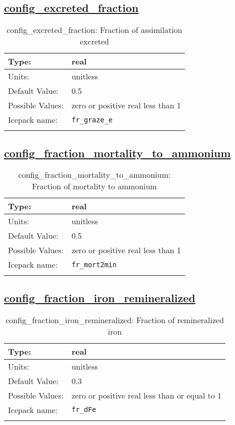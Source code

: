 \subsection[config\_excreted\_fraction]{\hyperref[sec:nm_tab_biogeochemistry]{config\_excreted\_fraction}}
\label{subsec:nm_sec_config_excreted_fraction}
\begin{center}
\begin{longtable}{| p{2.0in} || p{4.0in} |}
    \hline
    Type: & real \\
    \hline
    Units: & \si{unitless} \\
    \hline
    Default Value: & 0.5 \\
    \hline
    Possible Values: & zero or positive real less than 1 \\
    \hline
    Icepack name: & \verb+fr_graze_e+ \\
    \hline
    \caption{config\_excreted\_fraction: Fraction of assimilation excreted}
\end{longtable}
\end{center}
\subsection[config\_fraction\_mortality\_to\_ammonium]{\hyperref[sec:nm_tab_biogeochemistry]{config\_fraction\_mortality\_to\_ammonium}}
\label{subsec:nm_sec_config_fraction_mortality_to_ammonium}
\begin{center}
\begin{longtable}{| p{2.0in} || p{4.0in} |}
    \hline
    Type: & real \\
    \hline
    Units: & \si{unitless} \\
    \hline
    Default Value: & 0.5 \\
    \hline
    Possible Values: & zero or positive real less than 1 \\
    \hline
    Icepack name: & \verb+fr_mort2min+ \\
    \hline
    \caption{config\_fraction\_mortality\_to\_ammonium: Fraction of mortality to ammonium}
\end{longtable}
\end{center}
\subsection[config\_fraction\_iron\_remineralized]{\hyperref[sec:nm_tab_biogeochemistry]{config\_fraction\_iron\_remineralized}}
\label{subsec:nm_sec_config_fraction_iron_remineralized}
\begin{center}
\begin{longtable}{| p{2.0in} || p{4.0in} |}
    \hline
    Type: & real \\
    \hline
    Units: & \si{unitless} \\
    \hline
    Default Value: & 0.3 \\
    \hline
    Possible Values: & zero or positive real less than or equal to 1 \\
    \hline
    Icepack name: & \verb+fr_dFe+ \\
    \hline
    \caption{config\_fraction\_iron\_remineralized: Fraction of remineralized iron }
\end{longtable}
\end{center}

